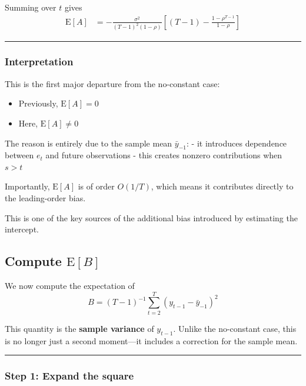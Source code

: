 \documentclass[11pt]{article}
\providecommand{\tightlist}{%
      \setlength{\itemsep}{0pt}\setlength{\parskip}{0pt}}
\begin{document}
Summing over \(t\) gives \[
\begin{aligned}
\text{E}[A]
&= -\frac{\sigma^2}{(T-1)^2(1-\rho)}
\left[(T-1) - \frac{1-\rho^{T-1}}{1-\rho}\right]
\end{aligned}
\]

\begin{center}\rule{0.5\linewidth}{0.5pt}\end{center}

\subsubsection{Interpretation}\label{interpretation}

This is the first major departure from the no-constant case:

\begin{itemize}
\tightlist
\item
  Previously, \(\text{E}[A] = 0\)
\item
  Here, \(\text{E}[A] \neq 0\)
\end{itemize}

The reason is entirely due to the sample mean \(\bar y_{-1}\): - it
introduces dependence between \(e_t\) and future observations - this
creates nonzero contributions when \(s > t\)

Importantly, \(\text{E}[A]\) is of order \(O(1/T)\), which means it
contributes directly to the leading-order bias.

This is one of the key sources of the additional bias introduced by
estimating the intercept.

    \subsection{\texorpdfstring{Compute
\(\text{E}[B]\)}{Compute \textbackslash text\{E\}{[}B{]}}}\label{compute-texteb}

We now compute the expectation of \[
B = (T-1)^{-1}\sum_{t=2}^{T} (y_{t-1}-\bar y_{-1})^2
\]

This quantity is the \textbf{sample variance} of \(y_{t-1}\). Unlike the
no-constant case, this is no longer just a second moment---it includes a
correction for the sample mean.

\begin{center}\rule{0.5\linewidth}{0.5pt}\end{center}

\subsubsection{Step 1: Expand the
square}\label{step-1-expand-the-square}
\end{document}
